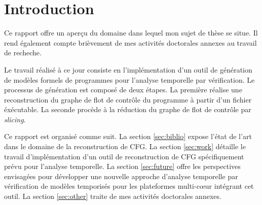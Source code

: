 \section*{Introduction}

  Ce rapport offre un aperçu du domaine dans lequel mon sujet de thèse se situe.
  Il rend également compte brièvement de mes activités doctorales annexes au
  travail de recheche.

  \medskip

  Le travail réalisé à ce jour consiste en l'implémentation d'un outil de
  génération de modèles formels de programmes pour l'analyse temporelle par
  vérification. Le processus de génération est composé de deux étapes. La
  première réalise une reconstruction du graphe de flot de contrôle du
  programme à partir d'un fichier éxécutable. La seconde procède à la réduction
  du graphe de flot de contrôle par \textit{slicing}.

  \medskip

  Ce rapport est organisé comme suit. La section \ref{sec:biblio} expose l'état
  de l'art dans le domaine de la reconstruction de CFG. La section
  \ref{sec:work} détaille le travail d'implémentation d'un outil de
  reconstruction de CFG spécifiquement prévu pour l'analyse temporelle. La
  section \ref{sec:future} offre les perspectives envisagées pour développer une
  nouvelle approche d'analyse temporelle par vérification de modèles temporisés
  pour les plateformes multi-c{\oe}ur intégrant cet outil. La section
  \ref{sec:other} traite de mes activités doctorales annexes.

